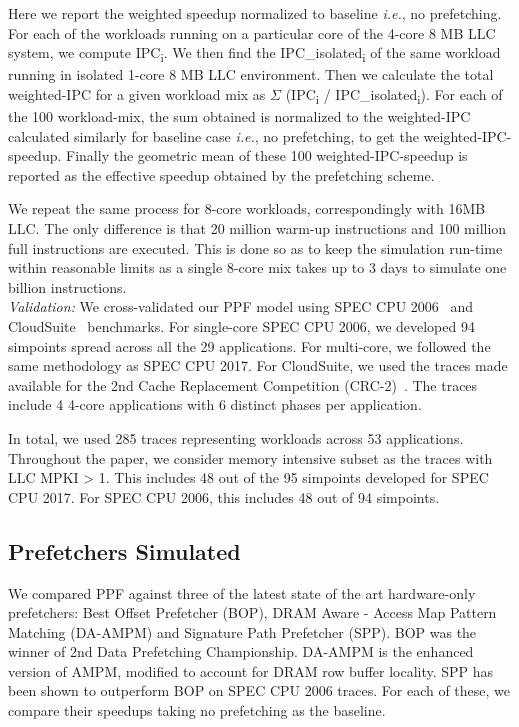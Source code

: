 Here we report the weighted speedup normalized to baseline
\textit{i.e.}, no prefetching. For each of the workloads running on a
particular core of the 4-core 8 MB LLC system, we compute
IPC\textsubscript{i}. We then find the IPC\_isolated\textsubscript{i}
of the same workload running in isolated 1-core 8 MB LLC environment.
Then we calculate the total weighted-IPC for a given workload mix as
$\Sigma$ (IPC\textsubscript{i} / IPC\_isolated\textsubscript{i}). For
each of the 100 workload-mix, the sum obtained is normalized to the
weighted-IPC calculated similarly for baseline case \textit{i.e.}, no
prefetching, to get the weighted-IPC-speedup. Finally the geometric
mean of these 100 weighted-IPC-speedup is reported as the effective
speedup obtained by the prefetching scheme.

We repeat the same process for 8-core workloads, correspondingly with 16MB
LLC. The only difference is that 20 million warm-up instructions and 100
million full instructions are executed. This is done so as to keep the
simulation run-time within reasonable limits as a single 8-core mix takes up
to 3 days to simulate one billion instructions.\\

\noindent \textit{Validation:} We cross-validated our PPF model using SPEC
CPU 2006~\cite{SPEC2006} and CloudSuite~\cite{CloudSuite} benchmarks. For
single-core SPEC CPU 2006, we developed 94 simpoints spread across all the 29
applications. For multi-core, we followed the same methodology as SPEC CPU 2017.
For CloudSuite, we used the traces made available for the 2nd Cache
Replacement Competition (CRC-2)~\cite{CRC_2}. The traces include 4 4-core
applications with 6 distinct phases per application.

In total, we used 285 traces representing workloads across 53 applications.
Throughout the paper, we consider memory intensive subset as the
traces with LLC MPKI > 1. This includes 48 out of the 95 simpoints
developed for SPEC CPU 2017. For SPEC CPU 2006, this includes 48 out of 94 simpoints.

\subsection{Prefetchers Simulated}
\label{Method-Prefetchers}
We compared PPF against three of the latest state of the art hardware-only
prefetchers: Best Offset Prefetcher (BOP), DRAM Aware - Access Map Pattern
Matching (DA-AMPM) \cite{DA_AMPM} and Signature Path Prefetcher (SPP). BOP was
the winner of 2nd Data Prefetching Championship. DA-AMPM is the enhanced
version of AMPM, modified to account for DRAM row buffer locality. SPP has
been shown to outperform BOP on SPEC CPU 2006 traces. For each of these, we
compare their speedups taking no prefetching as the baseline.

